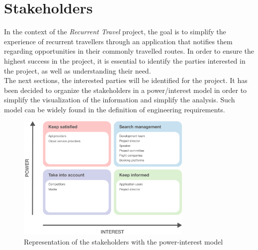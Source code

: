 \documentclass[../memory.tex]{subfiles}
\begin{document}
\section{Stakeholders}
In the context of the \emph{Recurrent Travel} project, the goal is to simplify
the experience of recurrent travellers through an application that notifies them
regarding opportunities in their commonly travelled routes. In order to ensure
the highest success in the project, it is essential to identify the parties
interested in the project, as well as understanding their need.
\\
The next sections, the interested parties will be identified for the project. It
has been decided to organize the stakeholders in a power/interest
model\cite{stakeholders-power-interest} in order to simplify the visualization
of the information and simplify the analysis. Such model can be widely found in
the definition of engineering requirements.
\begin{figure}[H]
	\centering
	\includegraphics[width=0.75\textwidth]{./assets/stakeholders.png}
	\caption{Representation of the stakeholders with the power-interest model}
\end{figure}
\end{document}
